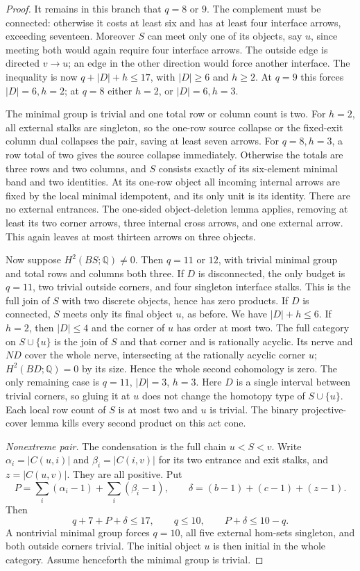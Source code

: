 \begin{proof}
It remains in this branch that $q=8$ or $9$. The complement
must be connected: otherwise it costs at least six and
has at least four interface arrows, exceeding seventeen.
Moreover $S$ can meet only one of its objects, say $u$,
since meeting both would again require four interface
arrows. The outside edge is directed $v\to u$; an edge
in the other direction would force another interface.
The inequality is now $q+|D|+h\le17$, with $|D|\ge6$
and $h\ge2$. At $q=9$ this forces $|D|=6,h=2$; at
$q=8$ either $h=2$, or $|D|=6,h=3$.

The minimal group is trivial and one total row or column
count is two. For $h=2$, all external stalks are singleton,
so the one-row source collapse or the fixed-exit column
dual collapses the pair, saving at least seven arrows.
For $q=8,h=3$, a row total of two gives the source
collapse immediately. Otherwise the totals are three
rows and two columns, and $S$ consists exactly of its
six-element minimal band and two identities. At its
one-row object all incoming internal arrows are fixed
by the local minimal idempotent, and its only unit is
its identity. There are no external entrances. The
one-sided object-deletion lemma applies, removing at
least its two corner arrows, three internal cross arrows,
and one external arrow. This again leaves at most
thirteen arrows on three objects.

Now suppose $H^2(BS;\mathbb Q)\ne0$. Then $q=11$ or
$12$, with trivial minimal group and total rows and
columns both three. If $D$ is disconnected, the only
budget is $q=11$, two trivial outside corners, and four
singleton interface stalks. This is the full join of
$S$ with two discrete objects, hence has zero products.
If $D$ is connected, $S$ meets only its final object $u$,
as before. We have $|D|+h\le6$. If $h=2$, then
$|D|\le4$ and the corner of $u$ has order at most two.
The full category on $S\cup\{u\}$ is the join of $S$
and that corner and is rationally acyclic. Its nerve
and $ND$ cover the whole nerve, intersecting at the
rationally acyclic corner $u$; $H^2(BD;\mathbb Q)=0$
by its size. Hence the whole second cohomology is zero.
The only remaining case is $q=11$, $|D|=3$, $h=3$.
Here $D$ is a single interval between trivial corners,
so gluing it at $u$ does not change the homotopy type
of $S\cup\{u\}$. Each local row count of $S$ is at most
two and $u$ is trivial. The binary projective-cover
lemma kills every second product on this act cone.

\emph{Nonextreme pair.} The condensation is the full
chain $u<S<v$. Write $\alpha_i=|C(u,i)|$ and
$\beta_i=|C(i,v)|$ for its two entrance and exit
stalks, and $z=|C(u,v)|$. They are all positive. Put
\[
 P=\sum_i(\alpha_i-1)+\sum_i(\beta_i-1),\qquad
 \delta=(b-1)+(c-1)+(z-1).
\]
Then
\[
 q+7+P+\delta\le17,
 \qquad q\le10,\qquad P+\delta\le10-q.
\]
A nontrivial minimal group forces $q=10$, all five
external hom-sets singleton, and both outside corners
trivial. The initial object $u$ is then initial in
the whole category. Assume henceforth the minimal
group is trivial.


\end{proof}
